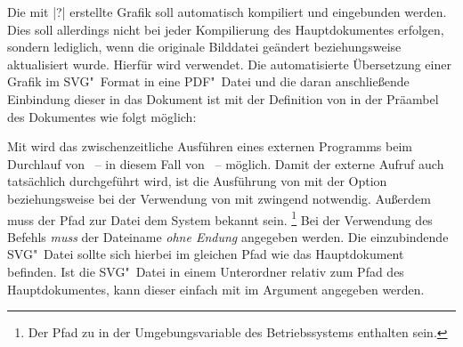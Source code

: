 Die mit |?| erstellte Grafik soll automatisch kompiliert 
und eingebunden werden. Dies soll allerdings nicht bei jeder Kompilierung des 
Hauptdokumentes erfolgen, sondern lediglich, wenn die originale Bilddatei 
geändert beziehungsweise aktualisiert wurde. Hierfür wird  
verwendet. Die automatisierte Übersetzung einer Grafik im SVG"~Format in eine 
PDF"~Datei und die daran anschließende Einbindung dieser in das Dokument ist 
mit der Definition von  
in der Präambel des Dokumentes wie folgt möglich:
%
%
\begin{quoting}
\end{quoting}
%
Mit  wird das 
zwischenzeitliche Ausführen eines externen Programms beim Durchlauf von 
~-- in diesem Fall von ~-- möglich. Damit 
der externe Aufruf auch tatsächlich durchgeführt wird, ist die Ausführung von  
 mit der Option  beziehungsweise bei 
der Verwendung von  mit  
zwingend notwendig. Außerdem muss der Pfad zur Datei  dem 
System bekannt sein.%
\footnote{%
  Der Pfad zu  in der Umgebungsvariable  des 
  Betriebssystems enthalten sein.
}
Bei der Verwendung des Befehls  \emph{muss} der Dateiname 
\emph{ohne Endung} angegeben werden. Die einzubindende SVG"~Datei sollte sich 
hierbei im gleichen Pfad wie das Hauptdokument befinden. Ist die SVG"~Datei in 
einem Unterordner relativ zum Pfad des Hauptdokumentes, kann dieser einfach mit 
 im Argument 
angegeben werden.



